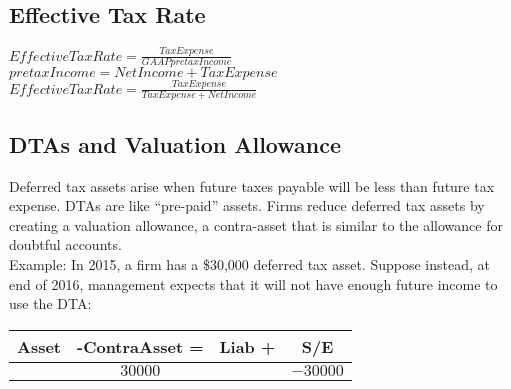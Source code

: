 \subsection*{ Effective Tax Rate}

$EffectiveTaxRate = \frac{TaxExpense}{GAAPpretaxIncome}$  \\
$ pretaxIncome = NetIncome + TaxExpense $ \\
$EffectiveTaxRate = \frac{TaxExpense}{TaxExpense+NetIncome}$  

\subsection*{DTAs and Valuation Allowance}

Deferred tax assets arise when future taxes payable will be less than future tax expense. DTAs are like “pre-paid” assets.
Firms reduce deferred tax assets by creating a valuation allowance, a contra-asset that is
similar to the allowance for doubtful accounts.\\


Example: In 2015, a firm has a \$30,000 deferred tax asset.
Suppose instead, at end of 2016, management expects that it will not have enough future income
to use the DTA:
\begin{tabular}{ |c|c||c|c| } 
	\hline
	Asset &-ContraAsset = & Liab +  & S/E	 \\ 
	\hline
	& $30000$ &  & $-30000$	 \\ 	
	\hline
\end{tabular} 